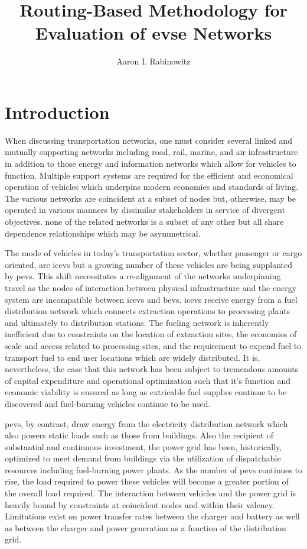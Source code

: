 \documentclass[12pt]{article}
\title{Routing-Based Methodology for Evaluation of \gls{evse} Networks}
\author{Aaron I. Rabinowitz}
\date{}
\begin{document}
\maketitle

\section*{Introduction}

When discussing transportation networks, one must consider several linked and mutually supporting networks including road, rail, marine, and air infrastructure in addition to those energy and information networks which allow for vehicles to function. Multiple support systems are required for the efficient and economical operation of vehicles which underpins modern economies and standards of living. The various networks are coincident at a subset of nodes but, otherwise, may be operated in various manners by dissimilar stakeholders in service of divergent objectives. none of the related networks is a subset of any other but all share dependence relationships which may be asymmetrical.

The mode of vehicles in today's transportation sector, whether passenger or cargo oriented, are \glspl{icev} but a growing number of these vehicles are being supplanted by \glspl{pev}. This shift necessitates a re-alignment of the networks underpinning travel as the nodes of interaction between physical infrastructure and the energy system are incompatible between \glspl{icev} and \glspl{bev}. \glspl{icev} receive energy from a fuel distribution network which connects extraction operations to processing plants and ultimately to distribution stations. The fueling network is inherently inefficient due to constraints on the location of extraction sites, the economies of scale and access related to processing sites, and the requirement to expend fuel to transport fuel to end user locations which are widely distributed. It is, nevertheless, the case that this network has been subject to tremendous amounts of capital expenditure and operational optimization such that it's function and economic viability is ensured as long as extricable fuel supplies continue to be discovered and fuel-burning vehicles continue to be used.

\glspl{pev}, by contrast, draw energy from the electricity distribution network which also powers static loads such as those from buildings. Also the recipient of substantial and continuous investment, the power grid has been, historically, optimized to meet demand from buildings via the utilization of dispatchable resources including fuel-burning power plants. As the number of \glspl{pev} continues to rise, the load required to power these vehicles will become a greater portion of the overall load required. The interaction between vehicles and the power grid is heavily bound by constraints at coincident nodes and within their valency. Limitations exist on power transfer rates between the charger and battery as well as between the charger and power generation as a function of the distribution grid.
\end{document}
